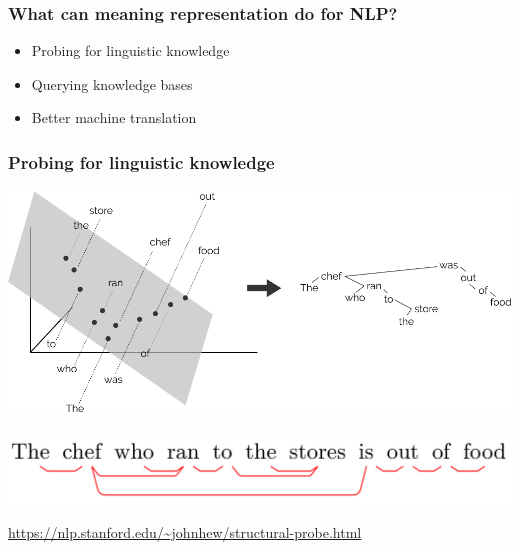 \documentclass[t,xcolor={svgnames,table}]{beamer}
\begin{document}
\begin{frame}
\frametitle{What can meaning representation do for NLP?}
 \begin{itemize}
 \item Probing for linguistic knowledge
 \item Querying knowledge bases
 \item Better machine translation
 \end{itemize}
\end{frame}

\begin{frame}
\frametitle{Probing for linguistic knowledge}
\includegraphics[width=\textwidth]{probe.png}

\includegraphics[width=\textwidth]{simple-tree.png}

\url{https://nlp.stanford.edu/~johnhew/structural-probe.html}
\end{frame}
\end{document}
